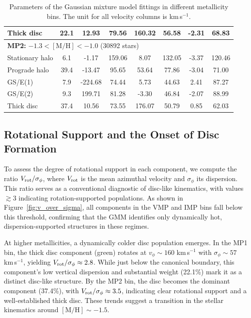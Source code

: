 \documentclass[a4paper,12pt]{article}
\begin{document}
\begin{table}
\begin{tabular}{lccccccc}
Thick disc          & 22.1 &  12.93  &  79.56 & 160.32  &  56.58 & -2.31 &  68.83 \\
\hline
\multicolumn{8}{l}{\textbf{MP2:} $-1.3 < \mathrm{[M/H]} < -1.0$ (30892 stars)} \\
Stationary halo     &  6.1 &  -1.17  & 159.06 &   8.07  & 132.05 & -3.37 & 120.46 \\
Prograde halo       & 39.4 & -13.47  &  95.65 &  53.64  &  77.86 & -3.04 &  71.00 \\
GS/E(1)             &  7.9 & -224.68 &  74.44 &   5.73  &  44.63 &  2.41 &  87.27 \\
GS/E(2)             &  9.3 &  199.71 &  81.28 &  -3.30  &  46.84 & -2.07 &  88.99 \\
Thick disc          & 37.4 &  10.56  &  73.55 & 176.07  &  50.79 &  0.85 &  62.03 \\
\hline
\end{tabular}
\caption{Parameters of the Gaussian mixture model fittings in different metallicity bins.
 The unit for all velocity columns is km\,s$^{-1}$.}
\label{tab:gmm_parameters}
\end{table}

\subsection{Rotational Support and the Onset of Disc Formation}

To assess the degree of rotational support in each component, we compute the ratio 
$V_{\rm rot} / \sigma_\phi$, where $V_{\rm rot}$ is the mean azimuthal velocity and 
$\sigma_\phi$ its dispersion. This ratio serves as a conventional diagnostic of disc-like 
kinematics, with values $\gtrsim 3$ indicating rotation-supported populations. As shown in 
Figure~\ref{fig:v_over_sigma}, all components in the VMP and IMP bins fall below this threshold, 
confirming that the GMM identifies only dynamically hot, dispersion-supported structures in these 
regimes.

At higher metallicities, a dynamically colder disc population emerges. In the MP1 bin, the thick 
disc component (green) rotates at $v_\phi \sim 160$ km\,s$^{-1}$ with $\sigma_\phi \sim 57$ km\,s$^{-1}$, 
yielding $V_{\rm rot} / \sigma_\phi \approx 2.8$. While just below the canonical boundary, this 
component’s low vertical dispersion and substantial weight (22.1\%) mark it as a distinct disc-like 
structure. By the MP2 bin, the disc becomes the dominant component (37.4\%), with 
$V_{\rm rot} / \sigma_\phi \approx 3.5$, indicating clear rotational support and a well-established 
thick disc. These trends suggest a transition in the stellar kinematics around 
$\mathrm{[M/H]} \sim -1.5$.
\end{document}
